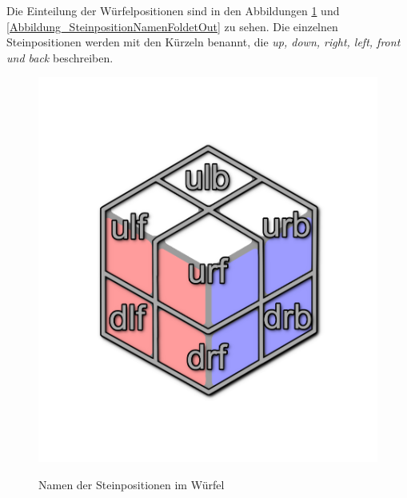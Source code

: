 \documentclass[12pt,a4paper, usenames, dvipsnames]{article}
\theoremstyle{mystyle}
\theoremstyle{definition}
\begin{document}
Die Einteilung der Würfelpositionen sind in den Abbildungen \ref{Abbildung_SteinpositionNamen} und \ref{Abbildung_SteinpositionNamenFoldetOut} zu sehen. Die einzelnen Steinpositionen werden mit den Kürzeln benannt, die \textit{up, down, right, left, front und back} beschreiben.
\begin{figure}[H]
\centering
\includegraphics[scale=0.14]{caged_positions.png} \\
\caption[Namen der Steinpositionen im Würfel]{Namen der Steinpositionen im Würfel}
\label{Abbildung_SteinpositionNamen}
\end{figure}
\end{document}
